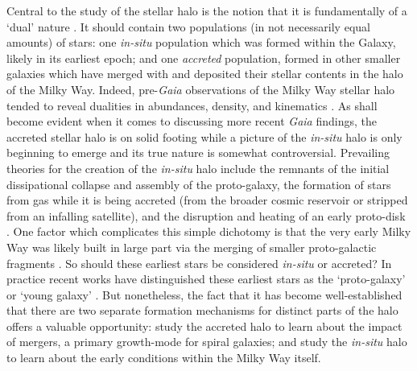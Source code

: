 Central to the study of the stellar halo is the notion that it is fundamentally of a `dual' nature \parencite{norris94,zolotov09}. It should contain two populations (in not necessarily equal amounts) of stars: one \textit{in-situ} population which was formed within the Galaxy, likely in its earliest epoch; and one \textit{accreted} population, formed in other smaller galaxies which have merged with and deposited their stellar contents in the halo of the Milky Way. Indeed, pre-\textit{Gaia} observations of the Milky Way stellar halo tended to reveal dualities in abundances, density, and kinematics \parencite[e.g.][]{kinman94,carollo07,nissen10,deason11}. As shall become evident when it comes to discussing more recent \textit{Gaia} findings, the accreted stellar halo is on solid footing while a picture of the \textit{in-situ} halo is only beginning to emerge and its true nature is somewhat controversial. Prevailing theories for the creation of the \textit{in-situ} halo include the remnants of the initial dissipational collapse and assembly of the proto-galaxy, the formation of stars from gas while it is being accreted (from the broader cosmic reservoir or stripped from an infalling satellite), and the disruption and heating of an early proto-disk \parencite{zolotov09,purcell10,font11,mccarthy12,tissera13,cooper15}. One factor which complicates this simple dichotomy is that the very early Milky Way was likely built in large part via the merging of smaller proto-galactic fragments \parencite[i.e. within the standard galaxy formation frameworks of ][]{white78,white91}. So should these earliest stars be considered \textit{in-situ} or accreted? In practice recent works have distinguished these earliest stars as the `proto-galaxy' or `young galaxy' \parencite[e.g.][]{belokurov22,conroy22}. But nonetheless, the fact that it has become well-established that there are two separate formation mechanisms for distinct parts of the halo offers a valuable opportunity: study the accreted halo to learn about the impact of mergers, a primary growth-mode for spiral galaxies; and study the \textit{in-situ} halo to learn about the early conditions within the Milky Way itself. 

